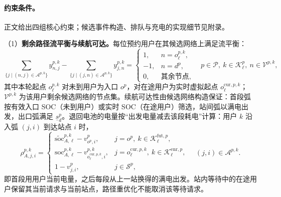 \documentclass[12pt,a4paper,UTF8]{ctexart}
\begin{document}
\paragraph{约束条件。}
正文给出四组核心约束；候选事件构造、排队与充电的实现细节见附录。

（1）\textbf{剩余路径流平衡与续航可达。}每位预约用户在其候选网络上满足流平衡：
\begin{equation}
\sum_{\{j\mid(n,j)\in\mathcal A^{p,k}\}}
y_{n,j}^{p,k}
-
\sum_{\{j\mid(j,n)\in\mathcal A^{p,k}\}}
y_{j,n}^{p,k}
=
\begin{cases}
1,&n=o_\ell^{p,k},\\
-1,&n=d^p,\\
0,&\text{其余节点},
\end{cases}
\quad
p\in\mathcal P,\ k\in\mathcal K_\ell^p,\ n\in\mathcal V^{p,k},
\label{eq:flow}
\end{equation}
其中本轮起点 $o_\ell^{p,k}$ 对未到用户为入口 $o^p$，对在途用户为实时虚拟起点 $o_\ell^{\mathrm{cur},p,k}$；$\mathcal V^{p,k}$ 为该用户剩余候选网络的节点集。续航可达性由候选网络构造保证：首段弧按有效入口 SOC（未到用户）或实时 SOC（在途用户）筛选，站间弧以满电出发，出口弧满足 $\underline s_d^p$。退回电池的电量按“出发电量减去该段耗电”计算：用户 $k$ 沿入弧 $(j,i)$ 到达站点 $i$ 时，
\begin{equation}
\rho_{A,j,i}^{p,k}
=
\begin{cases}
\widetilde{\mathrm{soc}}_{A,\ell}^{p,k}-v_{o^p,i}^{p},
&j=o^p,\ k\in\mathcal K_\ell^{\mathrm{fut},p},\\[2pt]
\mathrm{soc}_{A,\ell}^{p,k}
-v_{o_\ell^{\mathrm{cur},p,k},i}^{p,k},
&j=o_\ell^{\mathrm{cur},p,k},\ k\in\mathcal K_\ell^{\mathrm{enr},p},\\[2pt]
1-v_{j,i}^{p},
&j\in\mathcal S^p,
\end{cases}
\quad (j,i)\in\mathcal A^{p,k}.
\label{eq:return_soc}
\end{equation}
即首段用用户当前电量，之后每段从上一站换得的满电出发。站内等待中的在途用户保留其当前请求与当前站点，路径重优化不能取消该等待请求。
\end{document}
